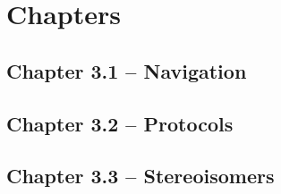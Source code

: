 
\chapter{Chapters}
\newpage


\section{Chapter 3.1 -- Navigation}





\newpage



\section{Chapter 3.2 -- Protocols}





\newpage



\section{Chapter 3.3 -- Stereoisomers}





\newpage


